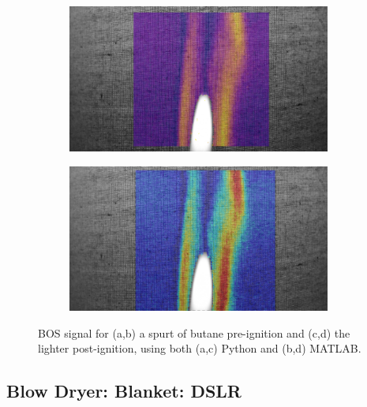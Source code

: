 \documentclass[letterpaper,12pt]{article}
\begin{document}
\begin{figure}[h]
	\begin{subfigure}[b]{0.45\textwidth}
    	\centering
        \includegraphics[width=0.95\textwidth]{Python_Lighter_DSLR.PNG}
        \caption{}
        \label{fig:Python_PostLighter_DSLR}
    \end{subfigure}
    \begin{subfigure}[b]{0.45\textwidth}
    	\centering
        \includegraphics[width=0.95\textwidth]{MATLAB_Lighter_DSLR.PNG}
        \caption{}
        \label{fig:MATLAB_PostLighter_DSLR}
    \end{subfigure}
	
    \caption{BOS signal for (a,b) a spurt of butane pre-ignition and (c,d) the lighter post-ignition, using both (a,c) Python and (b,d) MATLAB.}
    \label{fig:Lighter_Fluid}
\end{figure}

\subsection{Blow Dryer: Blanket: DSLR}
\label{subsec:Blow_Dryer_Blanket_DSLR}
\end{document}

